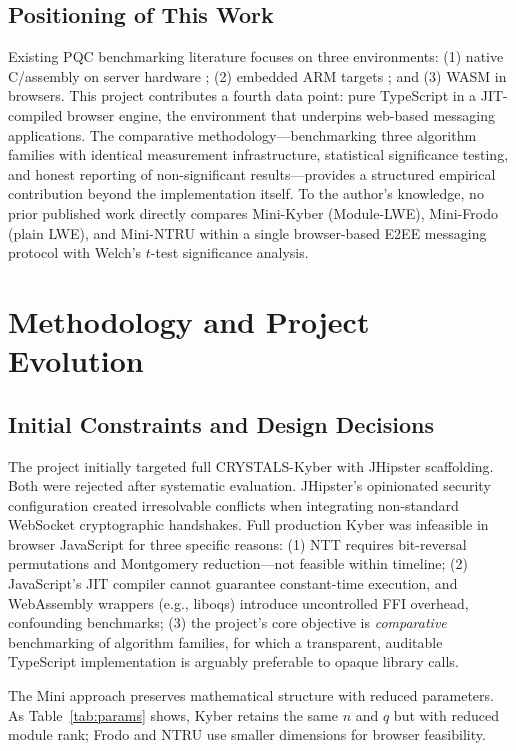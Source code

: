 \documentclass[11pt,a4paper]{article}
\begin{document}
\subsection{Positioning of This Work}

Existing PQC benchmarking literature focuses on three environments: (1) native C/assembly on server hardware \cite{crystals_kyber_spec, frodokem_spec}; (2) embedded ARM targets \cite{pqm4}; and (3) WASM in browsers. This project contributes a fourth data point: pure TypeScript in a JIT-compiled browser engine, the environment that underpins web-based messaging applications. The comparative methodology---benchmarking three algorithm families with identical measurement infrastructure, statistical significance testing, and honest reporting of non-significant results---provides a structured empirical contribution beyond the implementation itself. To the author's knowledge, no prior published work directly compares Mini-Kyber (Module-LWE), Mini-Frodo (plain LWE), and Mini-NTRU within a single browser-based E2EE messaging protocol with Welch's $t$-test significance analysis.

\section{Methodology and Project Evolution}

\subsection{Initial Constraints and Design Decisions}

The project initially targeted full CRYSTALS-Kyber with JHipster scaffolding. Both were rejected after systematic evaluation. JHipster's opinionated security configuration created irresolvable conflicts when integrating non-standard WebSocket cryptographic handshakes. Full production Kyber was infeasible in browser JavaScript for three specific reasons: (1) NTT requires bit-reversal permutations and Montgomery reduction---not feasible within timeline; (2) JavaScript's JIT compiler cannot guarantee constant-time execution, and WebAssembly wrappers (e.g., liboqs) introduce uncontrolled FFI overhead, confounding benchmarks; (3) the project's core objective is \emph{comparative} benchmarking of algorithm families, for which a transparent, auditable TypeScript implementation is arguably preferable to opaque library calls.

The Mini approach preserves mathematical structure with reduced parameters. As Table~\ref{tab:params} shows, Kyber retains the same $n$ and $q$ but with reduced module rank; Frodo and NTRU use smaller dimensions for browser feasibility.
\end{document}
